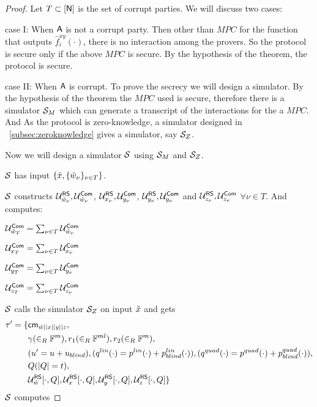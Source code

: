\begin{proof}
	Let $T\subset [\mathsf{N}]$ is the set of corrupt parties.
	We will discuss two cases: 
	
	case I: When $\mathsf{A}$ is not a corrupt party.
	Then other than $MPC$ for the function that outputs $\hat{f}^{xy}_i(\cdot)$, there is no interaction among the provers. So the protocol is secure only if the above $MPC$ is secure. By the hypothesis of the theorem, the protocol is secure.
	
	case II: When $\mathsf{A}$ is corrupt.
	To prove the secrecy we will design a simulator. 
	By the hypothesis of the theorem the $MPC$ used is secure, therefore there is a simulator $\mathcal{S}_{M}$ which can generate a transcript of the interactions for the a $MPC$.
	And As the protocol is zero-knowledge, a simulator designed in ~\ref{subsec:zeroknowledge} gives a simulator, say $\mathcal{S}_{Z}$.
	
	Now we will design a simulator $\mathcal{S}$ using $\mathcal{S}_{M}$ and $\mathcal{S}_{Z}$.
	
	$\mathcal{S}$ has input $\{\hat{x}, \{\hat{w}_{\nu}\}_{\nu \in T}\}$.
	
	$\mathcal{S}$ constructs $\mathcal{U}^{\mathsf{RS}}_{\hat{w}_{\nu}}, \mathcal{U}^{\mathsf{Com}}_{\hat{w}_{\nu}}$, $\mathcal{U}^{\mathsf{RS}}_{x_{\nu}}, \mathcal{U}^{\mathsf{Com}}_{y_{\nu}}$, $\mathcal{U}^{\mathsf{RS}}_{y_{\nu}}, \mathcal{U}^{\mathsf{Com}}_{y_{\nu}}$ and $\mathcal{U}^{\mathsf{RS}}_{z_{\nu}}, \mathcal{U}^{\mathsf{Com}}_{z_{\nu}}$ $\forall \nu\in T$.
	And computes:
	
	$\mathcal{U}^{\mathsf{Com}}_{\hat{w}_{T}} = \sum_{\nu \in T} \mathcal{U}^{\mathsf{Com}}_{\hat{w}_{\nu}}$
	
	$\mathcal{U}^{\mathsf{Com}}_{x_{T}} = \sum_{\nu \in T} \mathcal{U}^{\mathsf{Com}}_{x_{\nu}}$
	
	$\mathcal{U}^{\mathsf{Com}}_{y_{T}} = \sum_{\nu \in T} \mathcal{U}^{\mathsf{Com}}_{y_{\nu}}$
	
	$\mathcal{U}^{\mathsf{Com}}_{z_{T}} = \sum_{\nu \in T} \mathcal{U}^{\mathsf{Com}}_{z_{\nu}}$
	
	$\mathcal{S}$ calls the simulator $\mathcal{S}_{Z}$ on input $\hat{x}$ and gets 
	\begin{align*}
	\tau' = \{
	& \mathsf{cm}_{\hat{w}||x||y||z},\\
	& \gamma(\in_R \mathbb{F}^{m}), r_1(\in_R \mathbb{F}^{ml}), r_2(\in_R \mathbb{F}^m), \\ 
	& (u' = u+u_{blind}), (q^{lin}(\cdot) = p^{lin}(\cdot)+p^{lin}_{blind}(\cdot)), (q^{quad}(\cdot) = p^{quad}(\cdot) + p^{quad}_{blind}(\cdot)),\\
	& Q (|Q|=t),\\
	& \mathcal{U}^{\mathsf{RS}}_{\hat{w}}[\cdot, Q], \mathcal{U}^{\mathsf{RS}}_{x}[\cdot, Q], \mathcal{U}^{\mathsf{RS}}_{y}[\cdot, Q], \mathcal{U}^{\mathsf{RS}}_{z}[\cdot, Q]
	\}
	\end{align*}
	$\mathcal{S}$ computes 
	

\end{proof}
